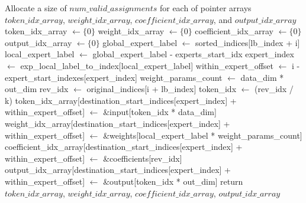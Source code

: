 \begin{algorithm}[H]
\begin{algorithmic}[1]
    \State Allocate a size of $num\_valid\_assignments$ for each of pointer arrays  $token\_idx\_array$, $weight\_idx\_array$, $coefficient\_idx\_array$, and $output\_idx\_array$
    \State token\_idx\_array $\leftarrow \{0\}$
    \State weight\_idx\_array $\leftarrow \{0\}$
    \State coefficient\_idx\_array $\leftarrow \{0\}$
    \State output\_idx\_array $\leftarrow \{0\}$
            \State global\_expert\_label $\leftarrow$ sorted\_indices[lb\_index + i]
            \State local\_expert\_label $\leftarrow$ global\_expert\_label - experts\_start\_idx
            \State expert\_index $\leftarrow$ exp\_local\_label\_to\_index[local\_expert\_label]
            \State within\_expert\_offset $\leftarrow$ i - expert\_start\_indexes[expert\_index]
            \State weight\_params\_count $\leftarrow$ data\_dim * out\_dim
                \State rev\_idx $\leftarrow$ original\_indices[i + lb\_index]
                \State token\_idx $\leftarrow$ (rev\_idx / k)
                \State token\_idx\_array[destination\_start\_indices[expert\_index] + within\_expert\_offset] $\leftarrow$ \&input[token\_idx * data\_dim]
                \State weight\_idx\_array[destination\_start\_indices[expert\_index] + within\_expert\_offset] $\leftarrow$ \&weights[local\_expert\_label * weight\_params\_count]
                \State coefficient\_idx\_array[destination\_start\_indices[expert\_index] + within\_expert\_offset] $\leftarrow$ \&coefficients[rev\_idx]
                \State output\_idx\_array[destination\_start\_indices[expert\_index] + within\_expert\_offset] $\leftarrow$ \&output[token\_idx * out\_dim]
            \EndIf
        \EndParallelFor
    \State return $token\_idx\_array$, $weight\_idx\_array$, $coefficient\_idx\_array$, $output\_idx\_array$
    \EndProcedure
  \end{algorithmic}
\end{algorithm}




